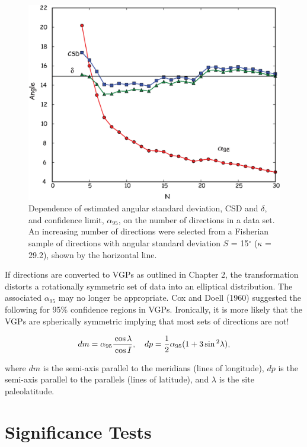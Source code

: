 \begin{figure}[htb]
\centering  \includegraphics[width= 10 cm]{EPSfiles/a95-csd.eps}
\caption { Dependence of estimated angular
standard deviation, CSD and $\delta$, and confidence
limit, $\alpha_{95}$, on the number of directions
in a data set. An increasing number
of directions were selected from a
Fisherian sample of directions with
angular standard deviation $S$ = 15$^{\circ}$
($\kappa$ = 29.2),  shown by the horizontal line.
}
\label{fig:a95-csd}
\end{figure}




If directions are converted to VGPs as outlined in Chapter 2,  the
transformation distorts a rotationally symmetric set of data
into an elliptical distribution.  The associated $\alpha_{95}$  may  no
longer be appropriate.  
Cox and Doell (1960) \nocite{cox60}  suggested the following for 95\% confidence regions in 
VGPs.  Ironically, it is more likely that the VGPs are spherically symmetric implying that most sets of directions are not!

\begin{equation}
dm = {\alpha_{95}}{\cos \lambda \over {\cos \bar I}}, \hskip 1em dp = {1\over 2}{\alpha_{95}}{(1 + 3 \sin^2 \lambda)},
\label{eq:dpdm}
\end{equation}

\noindent where $dm$ is the semi-axis parallel to  the meridians 
(lines of longitude), $dp$ is the semi-axis parallel to the parallels
(lines of latitude), and $\lambda$ is the site paleolatitude.


\section{Significance Tests}

